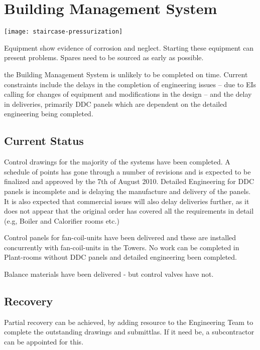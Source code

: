 \chapter{Building Management System}
\label{ch:bms}
\begin{marginfigure}%
  \texttt{[image: staircase-pressurization]}
  \caption{Equipment show evidence of corrosion and neglect. Starting these equipment can present problems. Spares need to be sourced as early as possible.}
  \label{fig:marginfig1}
\end{marginfigure}

 the Building Management  System is unlikely to be completed on time. Current constraints include the delays in the completion of engineering issues -- due to EIs calling for changes of equipment and modifications in the design --  and the delay in deliveries, primarily DDC panels which are dependent on the detailed engineering being completed.

\section{Current Status}

Control drawings for the majority of the systems have been completed. A schedule of points has gone through a number of revisions and is expected to be finalized and approved by the 7th of August 2010. Detailed Engineering for DDC panels is incomplete and is delaying the manufacture and delivery of the panels. It is also expected that commercial issues will also delay deliveries further, as it does not appear that the original order has covered all the requirements in detail (e.g, Boiler and Calorifier rooms etc.)

Control panels for fan-coil-units have been delivered and these are installed concurrently with fan-coil-units in the Towers.  No work can be completed in Plant-rooms without DDC panels and detailed engineering been completed.

Balance materials have been delivered - but control valves have not. 

\section{Recovery}
Partial recovery can be achieved, by adding resource to the Engineering Team to complete the outstanding drawings and submittlas. If it need be, a subcontractor can be appointed for this.

